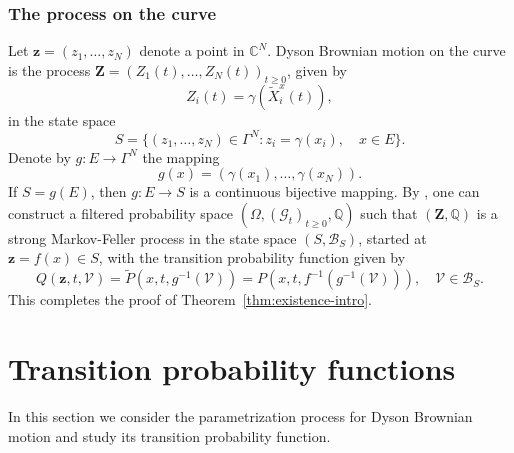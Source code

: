 \documentclass[11pt]{article}
\numberwithin{equation}{section}
\theoremstyle{definition}
\begin{document}
\subsubsection*{The process on the curve}
Let $\boldsymbol{z} = (z_{1},\dots,z_{N})$ denote a point in $\mathbb{C}^{N}$. Dyson Brownian motion on the curve is the process $\boldsymbol{Z} = (Z_{1}(t), \dots, Z_{N}(t))_{t\ge 0}$, given by 
\[
    Z_{i}(t) = \gamma(\tilde{X}_{i}^{x}(t)),
\]
in the state space
\[
S = \{(z_{1},\dots,z_{N})\in \Gamma^{N}: z_{i} = \gamma(x_{i}),\quad  x\in E\}.
\]
Denote by $g:E\to \Gamma^{N}$ the mapping 
\[
    g(x) = (\gamma(x_{1}), \dots, \gamma(x_{N})).    
\]
If $S = g(E)$, then $g:E\to S$ is a continuous bijective mapping. By \cite[Theorem 10.13]{dynkin1965markovI}, one can construct a filtered probability space $(\Omega, (\mathcal{G}_{t})_{t\ge 0}, \mathbb{Q})$ such that $(\boldsymbol{Z},\mathbb{Q})$ is a strong Markov-Feller process in the state space $(S, \mathcal{B}_{S})$, started at $\boldsymbol{z} = f(x)\in S$, with the transition probability function given by 
\[
    Q(\boldsymbol{z}, t, \mathcal{\mathcal{V}}) = \tilde{P}(x, t, g^{-1}(\mathcal{V}))=P(x,t,f^{-1}(g^{-1}(\mathcal{V}))), \quad \mathcal{V}\in \mathcal{B}_{S}.
\]
This completes the proof of Theorem~\ref{thm:existence-intro}.

\section{Transition probability functions}
In this section we consider the parametrization process for Dyson Brownian motion and study its transition probability function.
\end{document}
